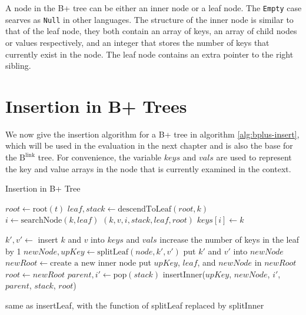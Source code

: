 \documentclass[11pt]{report}
\theoremstyle{definition}
\begin{document}
A node in the B+ tree can be either an inner node or a leaf node. The \texttt{Empty} case searves as \texttt{Null} in other languages. The structure of the inner node is similar to that of the leaf node, they both contain an array of keys, an array of child nodes or values respectively, and an integer that stores the number of keys that currently exist in the node. The leaf node contains an extra pointer to the right sibling.

\section{Insertion in B+ Trees}

We now give the insertion algorithm for a B+ tree in algorithm \ref{alg:bplus-insert}, which will be used in the evaluation in the next chapter and is also the base for the $\text{B}^{\text{link}}$ tree. For convenience, the variable $keys$ and $vals$ are used to represent the key and value arrays in the node that is currently examined in the context.

\begin{algorithm}[h]
  \caption{Insertion in B+ Tree}\label{alg:bplus-insert}
  \begin{algorithmic}[1] %
    \State $root \gets \text{root}(t)$
    \State $leaf, stack \gets \text{descendToLeaf}(root, k)$
    \State $i \gets \text{searchNode}(k, leaf)$
    \State {}$(k, v, i, stack, leaf, root)$
    \Else \State $keys[i] \gets k$
    \EndIf
    \EndFunction

    \State $k', v' \gets$ insert $k$ and $v$ into $keys$ and $vals$
    \State {}
    \State increase the number of keys in the leaf by 1
    \Else
    \State $newNode, upKey \gets \text{splitLeaf}(node, k', v')$
    \State put $k'$ and $v'$ into $newNode$
    \State $newRoot \gets \text{create a new inner node}$
    \State put $upKey$, $leaf$, and $newNode$ in $newRoot$
    \State $root \gets newRoot$
    \Else
    \State $parent, i' \gets \text{pop}(stack)$
    \State insertInner($upKey$, $newNode$, $i'$, $parent$, $stack$, $root$)
    \EndIf
    \EndIf
    \EndFunction

    \State same as insertLeaf, with the function of splitLeaf replaced by splitInner
    \EndFunction
  \end{algorithmic}
\end{algorithm}
\end{document}
